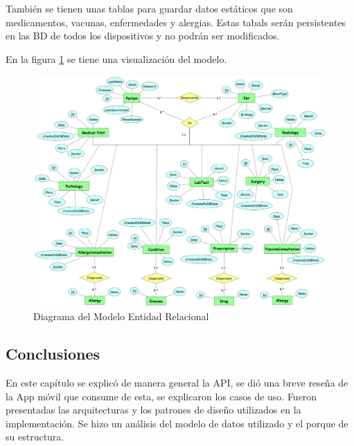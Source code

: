 También se tienen unas tablas para guardar datos estáticos que son medicamentos, vacunas, enfermedades y alergias. Estas tabals serán persistentes en las BD de todos los dispositivos y no podrán ser modificados. 

En la figura \ref{fig:model} se tiene una visualización del modelo.

\begin{figure}
	\centering
	\includegraphics[width = 15cm]{MainMatter/model.png}
	\caption{Diagrama del Modelo Entidad Relacional }
	\label{fig:model}
	
\end{figure}	

\subsection{Conclusiones}
En este capítulo se explicó de manera general la API, se dió una breve reseña de la App móvil que consume de esta, se explicaron los casos de uso. Fueron presentadas las arquitecturas y los patrones de diseño utilizados en la implementación. Se hizo un análisis del modelo de datos utilizado  y el porque de su estructura.

  

